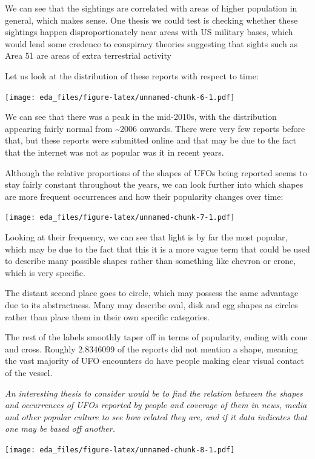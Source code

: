 \documentclass[
]{article}
\begin{document}
We can see that the sightings are correlated with areas of higher
population in general, which makes sense. One thesis we could test is
checking whether these sightings happen disproportionately near areas
with US military bases, which would lend some credence to conspiracy
theories suggesting that sights such as Area 51 are areas of extra
terrestrial activity

Let us look at the distribution of these reports with respect to time:

\texttt{[image: eda\_files/figure-latex/unnamed-chunk-6-1.pdf]}

We can see that there was a peak in the mid-2010s, with the distribution
appearing fairly normal from \textasciitilde2006 onwards. There were
very few reports before that, but these reports were submitted online
and that may be due to the fact that the internet was not as popular was
it in recent years.

Although the relative proportions of the shapes of UFOs being reported
seems to stay fairly constant throughout the years, we can look further
into which shapes are more frequent occurrences and how their popularity
changes over time:

\texttt{[image: eda\_files/figure-latex/unnamed-chunk-7-1.pdf]}

Looking at their frequency, we can see that light is by far the most
popular, which may be due to the fact that this it is a more vague term
that could be used to describe many possible shapes rather than
something like chevron or crone, which is very specific.

The distant second place goes to circle, which may possess the same
advantage due to its abstractness. Many may describe oval, disk and egg
shapes as circles rather than place them in their own specific
categories.

The rest of the labels smoothly taper off in terms of popularity, ending
with cone and cross. Roughly 2.8346099 of the reports did not mention a
shape, meaning the vast majority of UFO encounters do have people making
clear visual contact of the vessel.

\emph{An interesting thesis to consider would be to find the relation
between the shapes and occurrences of UFOs reported by people and
coverage of them in news, media and other popular culture to see how
related they are, and if it data indicates that one may be based off
another.}

\texttt{[image: eda\_files/figure-latex/unnamed-chunk-8-1.pdf]}
\end{document}
